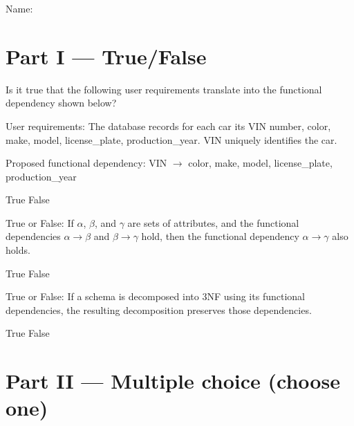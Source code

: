 \documentclass[12pt,answers]{exam}
\begin{document}
\noindent Name:\ \makebox[3in]{\hrulefill}
\begin{questions}

\section*{Part I — True/False}

\begin{minipage}{\linewidth}
\question[2]
Is it true that the following user requirements translate into the functional dependency shown below?

User requirements:
The database records for each car its VIN number, color, make, model, license\_plate, production\_year.
VIN uniquely identifies the car.

Proposed functional dependency:
VIN \(\to\) color, make, model, license\_plate, production\_year
\begin{checkboxes}
    \CorrectChoice True
    \choice False
\end{checkboxes}
\end{minipage}

\begin{minipage}{\linewidth}
\question[2]
True or False: If $\alpha$, $\beta$, and $\gamma$ are sets of attributes, and the 
functional dependencies $\alpha \to \beta$ and $\beta \to \gamma$ hold, then 
the functional dependency $\alpha \to \gamma$ also holds.

\begin{checkboxes}
    \CorrectChoice True
    \choice False
\end{checkboxes}
\end{minipage}


\begin{minipage}{\linewidth}
\question[2]
True or False: If a schema is decomposed into 3NF using its functional dependencies, the resulting decomposition preserves those dependencies.

\begin{checkboxes}
    \CorrectChoice True
    \choice False
\end{checkboxes}
\end{minipage}


\section*{Part II — Multiple choice (choose one)}


\end{questions}
\end{document}
